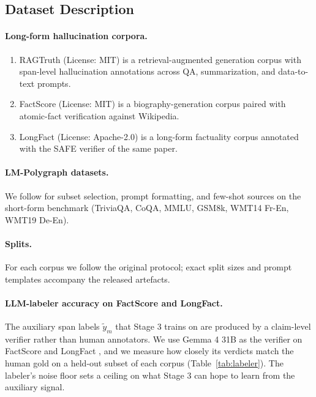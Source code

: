 \subsection{Dataset Description}

\paragraph{Long-form hallucination corpora.}
\begin{enumerate}
\item RAGTruth \citep{niu2024ragtruth} (License: MIT) is a
retrieval-augmented generation corpus with span-level hallucination
annotations across QA, summarization, and data-to-text prompts.
\item FactScore \citep{min2023} (License: MIT) is a
biography-generation corpus paired with atomic-fact verification
against Wikipedia.
\item LongFact \citep{wei2024} (License: Apache-2.0) is a
long-form factuality corpus annotated with the SAFE verifier of the
same paper.
\end{enumerate}

\paragraph{LM-Polygraph datasets.} We follow
\citet{vashurin2025lmpolygraph} for subset selection, prompt
formatting, and few-shot sources on the short-form benchmark
(TriviaQA, CoQA, MMLU, GSM8k, WMT14 Fr-En, WMT19 De-En).

\paragraph{Splits.} For each corpus we follow the original protocol;
exact split sizes and prompt templates accompany the released
artefacts.

\paragraph{LLM-labeler accuracy on FactScore and LongFact.} The
auxiliary span labels $\tilde{y}_m$ that Stage 3 trains on are
produced by a claim-level verifier rather than human annotators.
We use Gemma 4 31B as the verifier on FactScore \citep{min2023} and
LongFact \citep{wei2024}, and we measure how closely its verdicts
match the human gold on a held-out subset of each corpus
(Table~\ref{tab:labeler}). The labeler's noise floor sets a ceiling
on what Stage 3 can hope to learn from the auxiliary signal.


